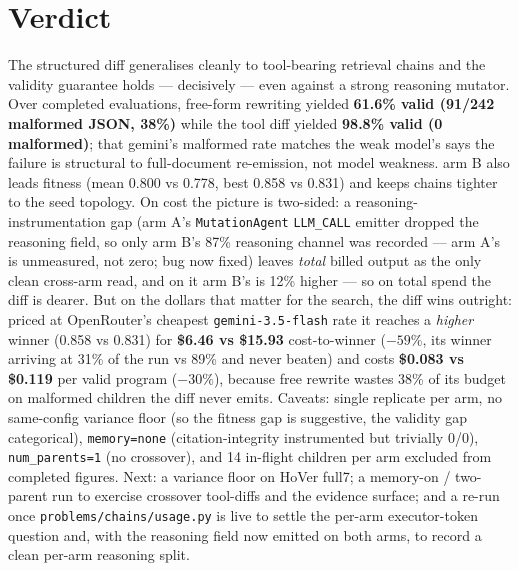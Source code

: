\documentclass[11pt]{article}
\newcommand{\armA}{\textcolor{bad}{arm A}}
\newcommand{\armB}{\textcolor{accent}{arm B}}
\begin{document}
\section{Verdict}
The structured diff generalises cleanly to tool-bearing retrieval chains and the validity
guarantee holds --- decisively --- even against a strong reasoning mutator. Over completed
evaluations, free-form rewriting yielded \textbf{61.6\% valid (91/242 malformed JSON, 38\%)}
while the tool diff yielded \textbf{98.8\% valid (0 malformed)}; that gemini's malformed rate
matches the weak model's says the failure is structural to full-document re-emission, not model
weakness. \armB{} also leads fitness (mean 0.800 vs 0.778, best 0.858 vs 0.831) and keeps chains
tighter to the seed topology. On cost the picture is two-sided: a reasoning-instrumentation gap
(\armA's \texttt{MutationAgent} \texttt{LLM\_CALL} emitter dropped the reasoning field, so only
\armB's 87\% reasoning channel was recorded --- \armA's is unmeasured, not zero; bug now fixed)
leaves \emph{total} billed output as the only clean cross-arm read, and on it \armB's is 12\%
higher --- so on total spend the diff is dearer. But
on the dollars that matter for the search, the diff wins outright: priced at OpenRouter's cheapest
\texttt{gemini-3.5-flash} rate it reaches a \emph{higher} winner (0.858 vs 0.831) for \textbf{\$6.46
vs \$15.93} cost-to-winner ($-59\%$, its winner arriving at 31\% of the run vs 89\% and never
beaten) and costs \textbf{\$0.083 vs \$0.119} per valid program ($-30\%$), because free rewrite
wastes 38\% of its budget on malformed children the diff never emits. Caveats:
single replicate per arm, no same-config variance floor (so the fitness gap is suggestive, the
validity gap categorical), \texttt{memory=none} (citation-integrity instrumented but trivially
0/0), \texttt{num\_parents=1} (no crossover), and 14 in-flight children per arm excluded from
completed figures. Next: a variance floor on HoVer full7; a memory-on / two-parent run to
exercise crossover tool-diffs and the evidence surface; and a re-run once
\texttt{problems/chains/usage.py} is live to settle the per-arm executor-token question and,
with the reasoning field now emitted on both arms, to record a clean per-arm reasoning split.
\end{document}
